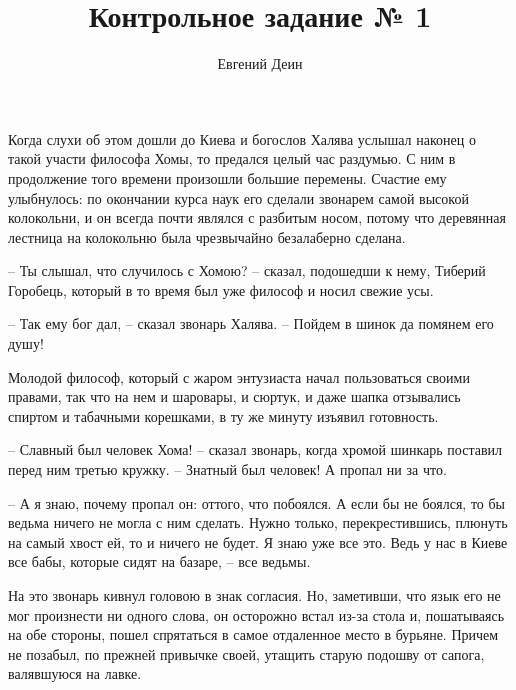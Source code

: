 \documentclass[a4paper, 12pt]{article}
\title{Контрольное задание № 1}
\author{Евгений Деин}
\begin{document}
	\maketitle
	Когда слухи об этом дошли до Киева и богослов Халява услышал наконец о такой
	участи философа Хомы, то предался целый час раздумью. С ним в продолжение того
	времени произошли большие перемены. Счастие ему улыбнулось: по окончании курса наук
	его сделали звонарем самой высокой колокольни, и он всегда почти являлся с разбитым
	носом, потому что деревянная лестница на колокольню была чрезвычайно безалаберно
	сделана.
	
	– Ты слышал, что случилось с Хомою? – сказал, подошедши к нему, Тиберий Горобець,
	который в то время был уже философ и носил свежие усы.
	
	– Так ему бог дал, – сказал звонарь Халява. – Пойдем в шинок да помянем его душу!
	
	Молодой философ, который с жаром энтузиаста начал пользоваться своими правами,
	так что на нем и шаровары, и сюртук, и даже шапка отзывались спиртом и табачными
	корешками, в ту же минуту изъявил готовность.
	
	– Славный был человек Хома! – сказал звонарь, когда хромой шинкарь поставил перед
	ним третью кружку. – Знатный был человек! А пропал ни за что.
	
	– А я знаю, почему пропал он: оттого, что побоялся. А если бы не боялся, то бы ведьма
	ничего не могла с ним сделать. Нужно только, перекрестившись, плюнуть на самый хвост ей,
	то и ничего не будет. Я знаю уже все это. Ведь у нас в Киеве все бабы, которые сидят на
	базаре, – все ведьмы.
	
	На это звонарь кивнул головою в знак согласия. Но, заметивши, что язык его не мог
	произнести ни одного слова, он осторожно встал из-за стола и, пошатываясь на обе стороны,
	пошел спрятаться в самое отдаленное место в бурьяне. Причем не позабыл, по прежней
	привычке своей, утащить старую подошву от сапога, валявшуюся на лавке.
\end{document}
